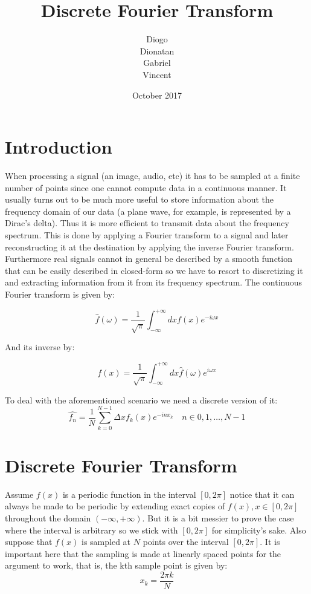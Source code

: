 \documentclass[titlepage]{article}
\title{Discrete Fourier Transform}
\author{
  Diogo \\ Dionatan \\ Gabriel \\ Vincent 
}
\date{October 2017}
\begin{document}
\maketitle

\section{Introduction}


When processing a signal (an image, audio, etc) it has to be sampled at a finite number of points since one cannot compute data in a continuous manner. It usually turns out to be much more useful to store information about the frequency domain of our data (a plane wave, for example, is represented by a Dirac's delta). Thus it is more efficient to transmit data about the frequency spectrum.  This is done by applying a Fourier transform to a signal and later reconstructing it at the destination by applying the inverse Fourier transform. Furthermore real signals cannot in general be described by a smooth function that can be easily described in closed-form so we have to resort to discretizing it and extracting information from it from its frequency spectrum. The continuous Fourier transform is given by:

$$\hat{f}(\omega) = \frac{1}{\sqrt{\pi}}\int_{-\infty}^{+\infty}dxf(x)e^{-i\omega x}$$

And its inverse by:

$$f(x) = \frac{1}{\sqrt{\pi}}\int_{-\infty}^{+\infty}dx\hat{f}(\omega)e^{i\omega x}$$

To deal with the aforementioned scenario we need a discrete version of it:
$$\hat{f_n} = \frac{1}{N}\sum_{k=0}^{N-1}\Delta xf_k(x)e^{-i n x_k}\quad n \in {0,1,\dots,N-1}$$

\section{Discrete Fourier Transform}

Assume $f(x)$ is a periodic function in the interval $[0,2\pi]$ notice that it can always be made to be periodic by extending exact copies of $f(x), x \in [0,2\pi]$ throughout the domain $(-\infty,+\infty)$. But it is a bit messier to prove the case where the interval is arbitrary so we stick with $[0, 2\pi]$ for simplicity's sake.
Also suppose that $f(x)$ is sampled at $N$ points over the interval $[0,2\pi]$. It is important here that the sampling is made at linearly spaced points for the argument to work, that is, the kth sample point is given by:
$$x_k = \frac{2\pi k}{N}$$
\end{document}
